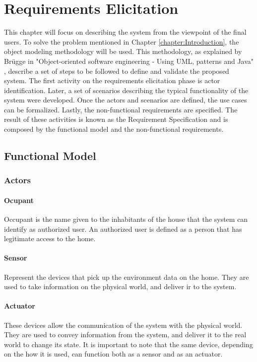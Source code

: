 
\chapter{Requirements Elicitation}
\label{chapter:elicitation}

This chapter will focus on describing the system from the viewpoint of the final users. To solve the problem mentioned in Chapter \ref{chapter:Introduction}, the object modeling methodology will be used. This methodology, as explained by Br{\"u}gge \etAl in "Object-oriented software engineering - Using UML, patterns and Java" \cite{Bruegge2004}, describe a set of steps to be followed to define and validate the proposed system. The first activity on the requirements elicitation phase is actor identification. Later, a set of scenarios describing the typical functionality of the system were developed. Once the actors and scenarios are defined, the use cases can be formalized. Lastly, the non-functional requirements are specified. The result of these activities is known as the Requirement Specification \cite{Bruegge2004} and is composed by the functional model and the non-functional requirements.

\section{Functional Model}
\subsection{Actors}
\subsubsection{Ocupant}
Occupant is the name given to the inhabitants of the house that the system can identify as authorized user. An authorized user is defined as a person that has legitimate access to the home.
\subsubsection{Sensor}
Represent the devices that pick up the environment data on the home. They are used to take information on the physical world, and deliver ir to the system.
\subsubsection{Actuator}
These devices allow the communication of the system with the physical world. They are used to convey information from the system, and deliver it to the real world to change its state. It is important to note that the same device, depending on the how it is used, can function both as a sensor and as an actuator.

